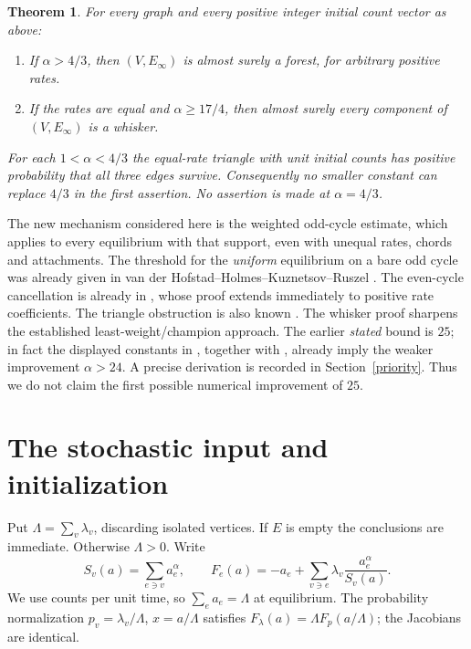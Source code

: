 \documentclass[11pt]{article}
\newtheorem{theorem}{Theorem}
\begin{document}
\begin{samepage}
\begin{theorem}\label{main}
For every graph and every positive integer initial count vector as above:
\begin{enumerate}
\item If $\alpha>4/3$, then $(V,E_\infty)$ is almost surely a forest,
for arbitrary positive rates.
\item If the rates are equal and $\alpha\ge17/4$, then almost surely every
component of $(V,E_\infty)$ is a whisker.
\end{enumerate}
For each $1<\alpha<4/3$ the equal-rate triangle with unit initial counts
has positive probability that all three edges survive.
Consequently no smaller constant can replace $4/3$ in the first assertion.
No assertion is made at $\alpha=4/3$.
\end{theorem}
\end{samepage}

The new mechanism considered here is the weighted odd-cycle estimate,
which applies to every equilibrium with that support, even with unequal
rates, chords and attachments. The threshold for the \emph{uniform}
equilibrium on a bare odd cycle was already given in
van der Hofstad--Holmes--Kuznetsov--Ruszel
\cite[Proposition~2(iv)]{VHHKR}. The even-cycle cancellation is already
in \cite[Lemma~2]{HHK}, whose proof extends immediately to positive rate
coefficients. The triangle obstruction is also known
\cite[Proposition~2(v), Theorem~4(ii)]{VHHKR}.
The whisker proof sharpens the established least-weight/champion approach.
The earlier \emph{stated} bound is $25$; in fact the displayed constants
in \cite[Section~5.1]{HK}, together with \cite{HHK}, already imply the
weaker improvement $\alpha>24$. A precise derivation is recorded in
Section~\ref{priority}. Thus we do not claim the first possible numerical
improvement of $25$.

\section{The stochastic input and initialization}
Put $\Lambda=\sum_v\lambda_v$, discarding isolated vertices. If $E$ is
empty the conclusions are immediate. Otherwise $\Lambda>0$. Write
\begin{equation}\label{field}
 S_v(a)=\sum_{e\ni v}a_e^\alpha,\qquad
 F_e(a)=-a_e+\sum_{v\ni e}\lambda_v\frac{a_e^\alpha}{S_v(a)}.
\end{equation}
We use counts per unit time, so $\sum_ea_e=\Lambda$ at equilibrium.
The probability normalization $p_v=\lambda_v/\Lambda$, $x=a/\Lambda$
satisfies $F_\lambda(a)=\Lambda F_p(a/\Lambda)$; the Jacobians are identical.
\end{document}
